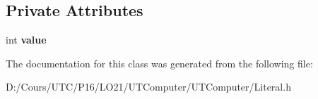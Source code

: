 \subsection*{Private Attributes}
\begin{DoxyCompactItemize}
\item 
int {\bfseries value}\hypertarget{class_integer_literal_aaf24d1cfa99b661cf8cc1c82b386d017}{}\label{class_integer_literal_aaf24d1cfa99b661cf8cc1c82b386d017}

\end{DoxyCompactItemize}


The documentation for this class was generated from the following file\+:\begin{DoxyCompactItemize}
\item 
D\+:/\+Cours/\+U\+T\+C/\+P16/\+L\+O21/\+U\+T\+Computer/\+U\+T\+Computer/Literal.\+h\end{DoxyCompactItemize}
